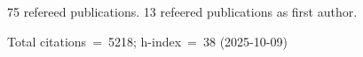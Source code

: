 75 refereed publications. 13 refeered publications as first author.

Total citations~=~5218; h-index~=~38 (2025-10-09)